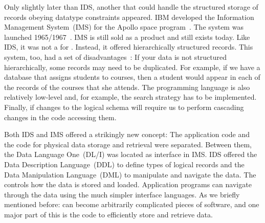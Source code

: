 Only slightly later than IDS, another  that could handle the structured storage of records obeying datatype constraints appeared.
IBM developed the Information Management System~(IMS) for the Apollo space program~\cite{KLBGNLWBS2012ITIYCGTIIMS}.
The system was launched 1965/1967~\cite{BBP2007TBOI}.
IMS is still sold as a product and still exists today.
Like IDS, it was not a  for \emph{}.
Instead, it offered hierarchically structured records.
This system, too, had a set of disadvantages~\cite{KC2024DS:ITD}:
If your data is not structured hierarchically, some records may need to be duplicated.
For example, if we have a database that assigns students to courses, then a student would appear in each of the records of the courses that she attends.
The programming language is also relatively low-level and, for example, the search strategy has to be implemented.
Finally, if changes to the logical schema will require us to perform cascading changes in the code accessing them.

Both IDS and IMS offered a strikingly new concept:
The application code and the code for physical data storage and retrieval were separated.
Between them, the Data Language One~(DL/I) was located as interface in IMS.
IDS offered the Data Description Language~(DDL) to define types of logical records and the Data Manipulation Language~(DML) to manipulate and navigate the data.
The  controls how the data is stored and loaded.
Application programs can navigate through the data using the much simpler interface languages.
As we briefly mentioned before:  can become arbitrarily complicated pieces of software, and one major part of this is the code to efficiently store and retrieve data.

